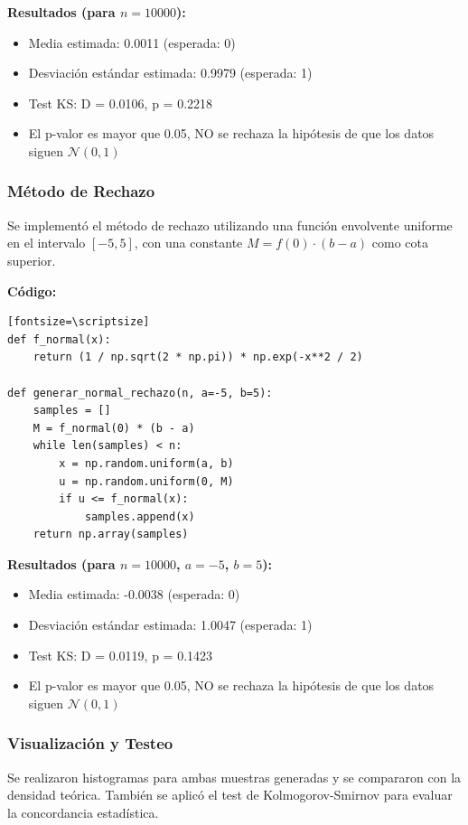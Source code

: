 \documentclass{article}
\begin{document}
\textbf{Resultados (para $n=10000$):}
\begin{itemize}
    \item Media estimada: 0.0011 (esperada: 0)
    \item Desviación estándar estimada: 0.9979 (esperada: 1)
    \item Test KS: D = 0.0106, p = 0.2218
    \item El p-valor es mayor que 0.05, NO se rechaza la hipótesis de que los datos siguen $\mathcal{N}(0,1)$
\end{itemize}

\vspace{0.5em}
\subsubsection{Método de Rechazo}
Se implementó el método de rechazo utilizando una función envolvente uniforme en el intervalo $[-5, 5]$, con una constante $M = f(0) \cdot (b-a)$ como cota superior.

\textbf{Código:}
\begin{verbatim}[fontsize=\scriptsize]
def f_normal(x):
    return (1 / np.sqrt(2 * np.pi)) * np.exp(-x**2 / 2)

def generar_normal_rechazo(n, a=-5, b=5):
    samples = []
    M = f_normal(0) * (b - a)
    while len(samples) < n:
        x = np.random.uniform(a, b)
        u = np.random.uniform(0, M)
        if u <= f_normal(x):
            samples.append(x)
    return np.array(samples)
\end{verbatim}

\textbf{Resultados (para $n=10000$, $a=-5$, $b=5$):}
\begin{itemize}
    \item Media estimada: -0.0038 (esperada: 0)
    \item Desviación estándar estimada: 1.0047 (esperada: 1)
    \item Test KS: D = 0.0119, p = 0.1423
    \item El p-valor es mayor que 0.05, NO se rechaza la hipótesis de que los datos siguen $\mathcal{N}(0,1)$
\end{itemize}

\vspace{0.5em}
\subsubsection{Visualización y Testeo}

Se realizaron histogramas para ambas muestras generadas y se compararon con la densidad teórica. También se aplicó el test de Kolmogorov-Smirnov para evaluar la concordancia estadística.
\end{document}
